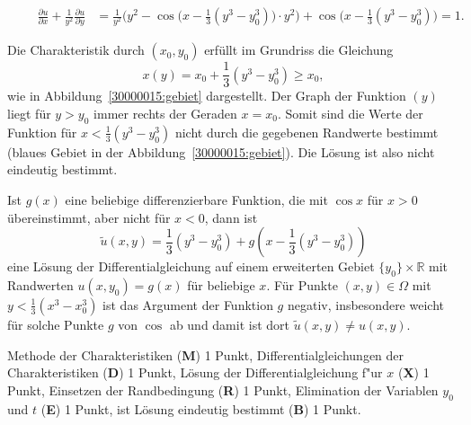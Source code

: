 \begin{loesung}
\begin{teilaufgaben}
\begin{align*}
\qquad
\frac{\partial u}{\partial x}
+
\frac1{y^2}
\frac{\partial u}{\partial y}
&=
\frac1{y^2}\biggl(y^2 -
\cos\bigl(x-{\textstyle\frac13}(y^3-y_0^3)\bigr)
\cdot y^2\biggr)
+
\cos\bigl(x-{\textstyle\frac13}(y^3-y_0^3)\bigr)
=1.
\end{align*}
\item
Die Charakteristik durch $(x_0,y_0)$ erfüllt im Grundriss die Gleichung
\[
x(y)
=
x_0 + {\textstyle\frac13}(y^3-y_0^3)
\ge
x_0,
\]
wie in Abbildung~\ref{30000015:gebiet} dargestellt.
Der Graph der Funktion $(y)$ liegt für $y>y_0$ immer rechts der
Geraden $x=x_0$.
Somit sind die Werte der Funktion für $x < {\textstyle\frac13}(y^3-y_0^3)$
nicht durch die gegebenen Randwerte bestimmt (blaues Gebiet in der
Abbildung~\ref{30000015:gebiet}).
Die Lösung ist also nicht eindeutig bestimmt.
\qedhere
\end{teilaufgaben}
\end{loesung}

\begin{diskussion}
Ist $g(x)$ eine beliebige differenzierbare Funktion, die mit $\cos x$ 
für $x>0$ übereinstimmt, aber nicht für $x<0$, dann ist
\[
\tilde u(x,y) = {\textstyle\frac13}(y^3-y_0^3) + g(x-{\textstyle\frac13}(y^3-y_0^3))
\]
eine Lösung der Differentialgleichung auf einem erweiterten Gebiet
$\{y_0\}\times \mathbb R$ mit Randwerten $u(x, y_0)=g(x)$ für beliebige $x$.
Für Punkte $(x,y)\in\Omega$ mit $y<{\textstyle\frac13}(x^3-x_0^3)$
ist das Argument
der Funktion $g$ negativ, insbesondere weicht für solche Punkte $g$ von
$\cos$ ab und damit ist dort $\tilde u(x,y)\ne u(x,y)$.
\end{diskussion}

\begin{bewertung}
Methode der Charakteristiken ({\bf M}) 1 Punkt,
Differentialgleichungen der Charakteristiken ({\bf D}) 1 Punkt,
Lösung der Differentialgleichung f"ur $x$ ({\bf X}) 1 Punkt,
Einsetzen der Randbedingung ({\bf R}) 1 Punkt,
Elimination der Variablen $y_0$ und $t$ ({\bf E}) 1 Punkt,
ist Lösung eindeutig bestimmt ({\bf B}) 1 Punkt.
\end{bewertung}



